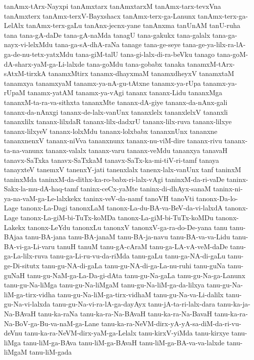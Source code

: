 {tanAmx-tArx-Nayxpi
tanAmxtarx
tanAmxtarxM
tanAmx-tarx-tevxVna
tanAmxterx
tanAmx-terxV-Bayxshacx
tanAmx-terx-ga-Lanunx
tanAmx-terx-ga-LelAlx
tanAmx-terx-gaLu
tanAnx-jecnx-yane
tanAnxma
tanUnAM
tanU-ruha
tana
tana-gA-daDe
tana-gA-naMda
tanagU
tana-gakukx
tana-galalx
tana-ga-nayx-vi-lelxMdu
tana-ga-sA-dhA-raNa
tanage
tana-ge-seye
tana-ge-ya-lilx-ra-lA-ga-de-nu-tetx-yatxMdu
tana-giM-talU
tana-gi-lalx-di-ra-beVku
tanago
tana-goM-dA-sharx-yaM-ga-Li-lalxde
tana-goMdu
tana-gobabx
tanaka
tanamxM-tArx-sAtxM-tirxkA
tanamxMtirx
tanamx-dhayxmaM
tanamxdheyxV
tanamxtaM
tanamxya
tanamxyaM
tanamx-ya-nA-gu-tAtxne
tanamx-ya-rUpa
tanamx-ya-rUpaM
tanamx-yatAM
tanamx-ya-vAgi
tananx
tananx-Lidu
tananxMga
tananxM-ta-ra-va-sithxta
tananxMte
tananx-dA-giye
tananx-da-nAnx-gali
tananx-da-nAnxgi
tananx-de-lalx-vanUnx
tananxlelx
tananxlelxV
tananxli
tananxlilx
tananx-lilxdaR
tananx-lilx-dadxrU
tananx-lilx-ruva
tananx-lilxye
tananx-lilxyeV
tananx-lolxMdu
tananx-lolxbabx
tananxnUnx
tananxne
tananxnenxV
tananx-niVva
tananxnunx
tananx-nu-viM-dire
tananx-rivu
tananx-ta-na-vanunx
tananx-valalx
tananx-varu
tananx-veMdu
tananxya
tanavaH
tanavx-SaTxka
tanavx-SaTxkaM
tanavx-SaTx-ka-mi-tiV-ri-tamf
tanaya
tanayxteV
tanemxV
tanenxY-jati
tanenxlalx
tanenx-lalx-vanUnx
tanf
taninxM
taninxMda
taninxM-da-dithx-ka-ro-babx-ri-lalx-vAgi
taninxM-da-ri-vaDe
taninx-Sakx-la-mu-dA-haq-tamf
taninx-ceCx-yaMte
taninx-di-dhAyx-sanaM
taninx-ni-ya-na-vaM-ga-Le-lalxkekx
taninx-veV-da-namf
tanoVH
tanoVti
tanonx-Da-lo-Lage
tanonx-La-Dagi
tanonxLaM
tanonx-La-du-BA-va-BeV-da-vi-lalxdA
tanonx-Lage
tanonx-La-giM-bi-TuTx-koMDa
tanonx-La-giM-bi-TuTx-koMDu
tanonx-Lakekx
tanonx-LeYdu
tanonxLu
tanonxV
tanonxV-ga-ra-do-De-yana
tanu
tanu-BAjaa
tanu-BA-jana
tanu-BA-janaM
tanu-BA-ja-navu
tanu-BA-va-va-Lidu
tanu-BA-vi-ga-Li-varu
tanuH
tanuM
tanu-gA-cAraM
tanu-ga-LA-vA-veM-daDe
tanu-ga-La-lilx-ruva
tanu-ga-Li-ru-vu-da-riMda
tanu-gaLu
tanu-ga-NA-di-gaLu
tanu-ge-Di-situtx
tanu-gu-NA-di-gaLa
tanu-gu-NA-di-ga-La-nu-ruhi
tanu-guNa
tanu-guNaH
tanu-gu-NaM-ga-La-Da-gi-dAta
tanu-gu-Na-gaLa
tanu-gu-Na-ga-Lanunx
tanu-gu-Na-liMga
tanu-gu-Na-liMgaM
tanu-gu-Na-liM-ga-da-lilxya
tanu-gu-Na-liM-ga-tirx-vidha
tanu-gu-Na-liM-ga-tirx-vidhaM
tanu-gu-Na-va-Li-dalilx
tanu-gu-Na-vi-lalxda
tanu-gu-Na-vi-ra-lA-ga-dayAyx
tanu-jA-ta-ri-lalx-dara
tanu-ka-ja-Na-BAvaH
tanu-ka-raNa
tanu-ka-ra-Na-BAvaH
tanu-ka-ra-Na-BavaH
tanu-ka-ra-Na-BoV-ga-Bu-va-naM-ga-Lane
tanu-ka-ra-NeVM-dirx-yA-yA-sa-diM-da-ri-vu-deVnu
tanu-ka-ra-NeVM-dirx-yaM-ga-Lelalx
tanu-kirxV-yiMda
tanu-kirxye
tanu-liMga
tanu-liM-ga-BAva
tanu-liM-ga-BAvaH
tanu-liM-ga-BA-va-va-lalxde
tanu-liMgaM
tanu-liM-gada
}
